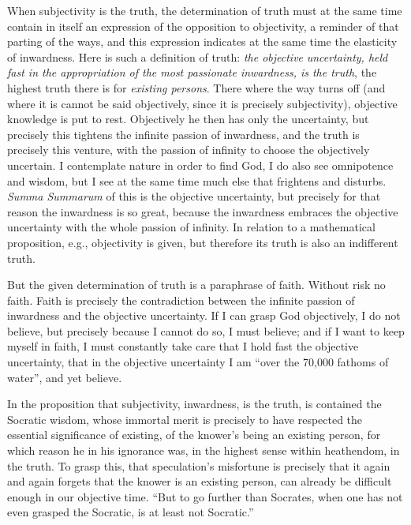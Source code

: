 \documentclass[12pt,a4paper,openany]{book}
\newcommand{\opage}[1]{\marginnote{\footnotesize\textit{[#1]}}}
\begin{document}
When subjectivity is the truth, the determination of truth must at the same time
contain in itself an expression of the opposition to objectivity, a reminder of that
parting of the ways, and this expression indicates at the same time the elasticity of
inwardness. Here is such a definition of truth: \emph{the objective}
\emph{uncertainty, held fast in the appropriation of the most passionate
inwardness, is the truth},
the highest truth there is for \emph{existing persons}. There where
the way turns off (and where it is cannot be said objectively,
since it is precisely subjectivity), objective knowledge is
put to rest. Objectively he then has only the uncertainty, but precisely
this tightens the infinite passion of inwardness, and
the truth is precisely this venture, with the passion of infinity to choose the
objectively uncertain. I contemplate nature in order to find God, I do also see
omnipotence and wisdom, but I see at the same time much else that frightens and
disturbs. \textit{Summa Summarum} of this is the objective uncertainty, but
precisely for that reason the inwardness is so great, because the inwardness
embraces the objective uncertainty with the whole passion of infinity.
In relation to a mathematical proposition, e.g., objectivity is given, but therefore
its truth is also an indifferent truth.

But the given determination of truth is a paraphrase of faith. Without risk no faith.
Faith is precisely the contradiction between the infinite passion of inwardness and the
objective uncertainty. If I can grasp God objectively, I do not believe, but precisely
because I cannot do so, I must believe; and
\setcounter{footnote}{0}%
\opage{189}if I want to keep myself in faith, I must constantly take care that I hold fast the
objective uncertainty, that in the objective uncertainty I am ``over the 70,000 fathoms
of water'', and yet believe.

In the proposition that subjectivity, inwardness, is the truth, is contained the
Socratic wisdom, whose immortal merit is precisely to have respected the essential
significance of existing, of the knower's being an existing person, for which reason he
in his ignorance was, in the highest sense within heathendom, in the truth. To grasp
this, that speculation's misfortune is precisely that it again and again forgets that
the knower is an existing person, can already be difficult enough in our objective
time. ``But to go further than Socrates, when one has not even grasped the Socratic,
is at least not Socratic.''
\end{document}
